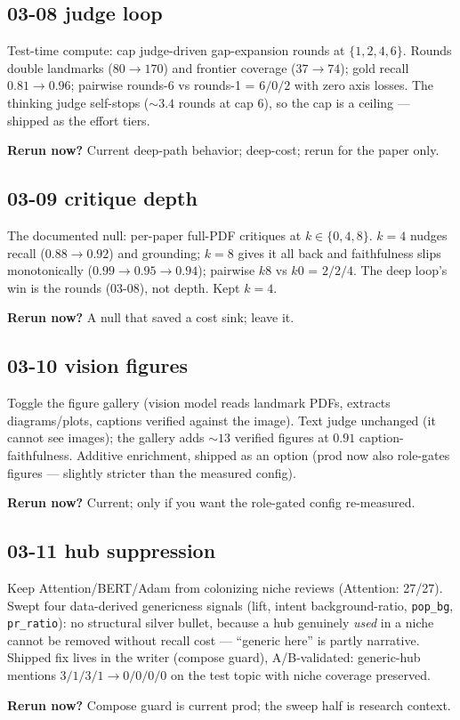 \documentclass[10pt]{article}
\newcommand{\rerun}[1]{\par\smallskip\noindent\textbf{Rerun now?} #1}
\begin{document}
\subsection*{03-08 judge loop}
Test-time compute: cap judge-driven gap-expansion rounds at $\{1,2,4,6\}$. Rounds double
landmarks ($80\to170$) and frontier coverage ($37\to74$); gold recall $0.81\to0.96$; pairwise
rounds-6 vs rounds-1 = $6/0/2$ with zero axis losses. The thinking judge self-stops
(${\sim}3.4$ rounds at cap 6), so the cap is a ceiling --- shipped as the effort tiers.
\rerun{Current deep-path behavior; deep-cost; rerun for the paper only.}

\subsection*{03-09 critique depth}
The documented null: per-paper full-PDF critiques at $k\in\{0,4,8\}$. $k{=}4$ nudges recall
($0.88\to0.92$) and grounding; $k{=}8$ gives it all back and faithfulness slips monotonically
($0.99\to0.95\to0.94$); pairwise $k8$ vs $k0$ = $2/2/4$. The deep loop's win is the rounds
(03-08), not depth. Kept $k{=}4$.
\rerun{A null that saved a cost sink; leave it.}

\subsection*{03-10 vision figures}
Toggle the figure gallery (vision model reads landmark PDFs, extracts diagrams/plots, captions
verified against the image). Text judge unchanged (it cannot see images); the gallery adds
${\sim}13$ verified figures at $0.91$ caption-faithfulness. Additive enrichment, shipped as an
option (prod now also role-gates figures --- slightly stricter than the measured config).
\rerun{Current; only if you want the role-gated config re-measured.}

\subsection*{03-11 hub suppression}
Keep Attention/BERT/Adam from colonizing niche reviews (Attention: 27/27). Swept four
data-derived genericness signals (lift, intent background-ratio, \texttt{pop\_bg},
\texttt{pr\_ratio}): no structural silver bullet, because a hub genuinely \emph{used} in a
niche cannot be removed without recall cost --- ``generic here'' is partly narrative. Shipped
fix lives in the writer (compose guard), A/B-validated: generic-hub mentions
$3/1/3/1 \to 0/0/0/0$ on the test topic with niche coverage preserved.
\rerun{Compose guard is current prod; the sweep half is research context.}
\end{document}
